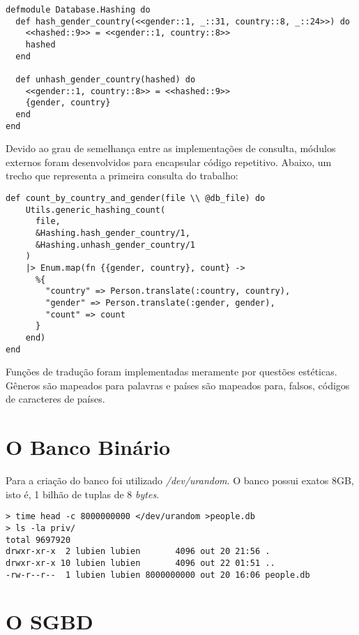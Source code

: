 \documentclass[12pt]{article}
\begin{document}
\begin{verbatim}
defmodule Database.Hashing do
  def hash_gender_country(<<gender::1, _::31, country::8, _::24>>) do
    <<hashed::9>> = <<gender::1, country::8>>
    hashed
  end
  
  def unhash_gender_country(hashed) do
    <<gender::1, country::8>> = <<hashed::9>>
    {gender, country}
  end
end
\end{verbatim}

Devido ao grau de semelhança entre as implementações de consulta, módulos externos
foram desenvolvidos para encapsular código repetitivo. Abaixo, um trecho que representa
a primeira consulta do trabalho:

\begin{verbatim}
def count_by_country_and_gender(file \\ @db_file) do
    Utils.generic_hashing_count(
      file,
      &Hashing.hash_gender_country/1,
      &Hashing.unhash_gender_country/1
    )
    |> Enum.map(fn {{gender, country}, count} ->
      %{
        "country" => Person.translate(:country, country),
        "gender" => Person.translate(:gender, gender),
        "count" => count
      }
    end)
end
\end{verbatim}

Funções de tradução foram implementadas meramente por questões estéticas. Gêneros
são mapeados para palavras e países são mapeados para, falsos, códigos de caracteres de países.

\section{O Banco Binário}

Para a criação do banco foi utilizado \textit{/dev/urandom}. O banco possui exatos
8GB, isto é, 1 bilhão de tuplas de 8 \textit{bytes}.

\begin{verbatim}
> time head -c 8000000000 </dev/urandom >people.db
> ls -la priv/
total 9697920
drwxr-xr-x  2 lubien lubien       4096 out 20 21:56 .
drwxr-xr-x 10 lubien lubien       4096 out 22 01:51 ..
-rw-r--r--  1 lubien lubien 8000000000 out 20 16:06 people.db

\end{verbatim}

\section{O SGBD}
\end{document}
